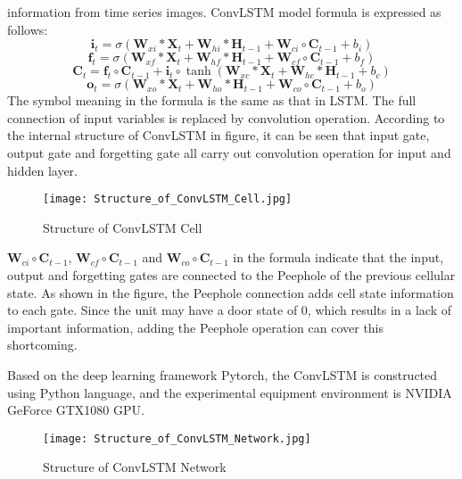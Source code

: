 \documentclass[../main]{subfiles}
\begin{document}
information from time series images. ConvLSTM model formula is expressed
as follows:
\begin{equation}
\mathbf{i}_t=\sigma(\mathbf{W}_{xi}*\mathbf{X}_{t}+\mathbf{W}_{hi}*\mathbf{H}_{t-1}+\mathbf{W}_{ci}\circ\mathbf{C}_{t-1}+b_i)
\end{equation}
\begin{equation}
\mathbf{f}_t=\sigma(\mathbf{W}_{xf}*\mathbf{X}_{t}+\mathbf{W}_{hf}*\mathbf{H}_{t-1}+\mathbf{W}_{cf}\circ\mathbf{C}_{t-1}+b_f) 
\end{equation}
\begin{equation}
\mathbf{C}_t=\mathbf{f}_{t}\circ\mathbf{C}_{t-1}+\mathbf{i}_t\circ\tanh(\mathbf{W}_{xc}*\mathbf{X}_{t}+\mathbf{W}_{hc}*\mathbf{H}_{t-1}+b_c)
\end{equation}
\begin{equation}
\mathbf{o}_t=\sigma(\mathbf{W}_{xo}*\mathbf{X}_{t}+\mathbf{W}_{ho}*\mathbf{H}_{t-1}+\mathbf{W}_{co}\circ\mathbf{C}_{t-1}+b_o)
\end{equation}
The symbol meaning in the formula is the same as that in LSTM. The full
connection of input variables is replaced by convolution operation.
According to the internal structure of ConvLSTM in figure, it can be
seen that input gate, output gate and forgetting gate all carry out
convolution operation for input and hidden layer.
\begin{figure}[h!]
\centering
\texttt{[image: Structure\_of\_ConvLSTM\_Cell.jpg]}
\caption{Structure of ConvLSTM Cell}
\end{figure}

\(\mathbf{W}_{ci}\circ\mathbf{C}_{t-1}\),
\(\mathbf{W}_{cf}\circ\mathbf{C}_{t-1}\) and
\(\mathbf{W}_{co}\circ\mathbf{C}_{t-1}\) in the formula indicate
that the input, output and forgetting gates are connected to the
Peephole\cite{861302} of the previous cellular state. As shown in
the figure, the Peephole connection adds cell state information to each
gate. Since the unit may have a door state of 0, which results in a lack
of important information, adding the Peephole operation can cover this
shortcoming.

Based on the deep learning framework Pytorch, the ConvLSTM is
constructed using Python language, and the experimental equipment
environment is NVIDIA GeForce GTX1080 GPU.
\begin{figure}[h!]
  \centering
  \texttt{[image: Structure\_of\_ConvLSTM\_Network.jpg]}
  \caption{Structure of ConvLSTM Network}
  \end{figure}
\end{document}

